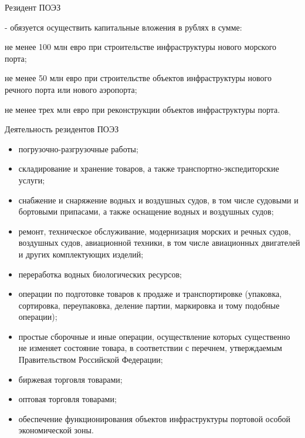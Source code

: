 \documentclass[_Venture_p3.tex]{subfiles}
\begin{document}
\begin{frame}{Резидент ПОЭЗ }
\begin{block}{}
	\quad
	- обязуется осуществить капитальные вложения в рублях в сумме:
	
	не менее 100 млн евро при строительстве инфраструктуры нового морского порта;
	
	не менее 50 млн евро при строительстве объектов инфраструктуры нового речного порта или нового аэропорта;
	
	не менее трех млн евро при реконструкции объектов инфраструктуры порта.
\end{block}
\end{frame}


\begin{frame}[allowframebreaks]{Деятельность резидентов ПОЭЗ}{}
\begin{itemize}
	\item погрузочно-разгрузочные работы;
	\item складирование и хранение товаров, а также транспортно-экспедиторские услуги;
	\item снабжение и снаряжение водных и воздушных судов, в том числе судовыми и бортовыми припасами, а также оснащение водных и воздушных судов;
	
	\pagebreak
	\item ремонт, техническое обслуживание, модернизация морских и речных судов, воздушных судов, авиационной техники, в том числе авиационных двигателей и других комплектующих изделий;
	\item переработка водных биологических ресурсов;

	\pagebreak
	\item операции по подготовке товаров к продаже и транспортировке (упаковка, сортировка, переупаковка, деление партии, маркировка и тому подобные операции);
	\item простые сборочные и иные операции, осуществление которых существенно не изменяет состояние товара, в соответствии с перечнем, утверждаемым Правительством Российской Федерации;

	\pagebreak
	\item биржевая торговля товарами;
	\item оптовая торговля товарами;
	\item обеспечение функционирования объектов инфраструктуры портовой особой экономической зоны.
\end{itemize}
\end{frame}
\end{document}
